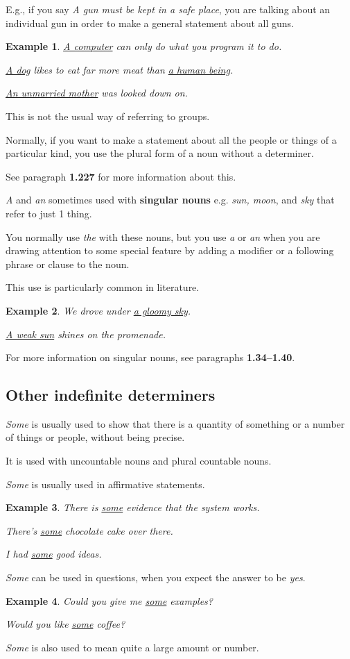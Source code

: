\documentclass[oneside]{book}
\numberwithin{equation}{section}
\newtheorem{example}{Example}[section]
\begin{document}
E.g., if you say \textit{A gun must be kept in a safe place}, you are talking about an individual gun in order to make a general statement about all guns.
\begin{example}
    \underline{A computer} can only do what you program it to do.
    
    \underline{A dog} likes to eat far more meat than \underline{a human being}.
    
    \underline{An unmarried mother} was looked down on.
\end{example}
This is not the usual way of referring to groups.

Normally, if you want to make a statement about all the people or things of a particular kind, you use the plural form of a noun without a determiner.

See paragraph \textbf{1.227} for more information about this.

%
\noindent{} \textit{A} and \textit{an} sometimes used with \textbf{singular nouns} e.g. \textit{sun, moon}, and \textit{sky} that refer to just 1 thing.

You normally use \textit{the} with these nouns, but you use \textit{a} or \textit{an} when you are drawing attention to some special feature by adding a modifier or a following phrase or clause to the noun.

This use is particularly common in literature.
\begin{example}
    We drove under \underline{a gloomy sky}.
    
    \underline{A weak sun} shines on the promenade.
\end{example}
For more information on singular nouns, see paragraphs \textbf{1.34--1.40}.

\subsection{Other indefinite determiners}
\noindent{} \textit{Some} is usually used to show that there is a quantity of something or a number of things or people, without being precise.

It is used with uncountable nouns and plural countable nouns.

%
\textit{Some} is usually used in affirmative statements.
\begin{example}
    There is \underline{some} evidence that the system works.
    
    There's \underline{some} chocolate cake over there.
    
    I had \underline{some} good ideas.
\end{example}
\textit{Some} can be used in questions, when you expect the answer to be \textit{yes}.
\begin{example}
    Could you give me \underline{some} examples?
    
    Would you like \underline{some} coffee?
\end{example}
\textit{Some} is also used to mean quite a large amount or number.
\end{document}
